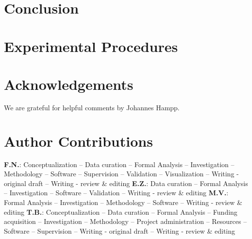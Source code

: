 \documentclass[12pt,preprint]{elsarticle}
\begin{document}


\section*{Conclusion}
\label{sec:conclusion}



\section*{Experimental Procedures}
\label{sec:methods}



\section*{Acknowledgements}


We are grateful for helpful comments by Johannes Hampp.



\section*{Author Contributions}


\textbf{F.N.}:
Conceptualization --
Data curation --
Formal Analysis --
Investigation --
Methodology --
Software --
Supervision --
Validation --
Visualization --
Writing - original draft --
Writing - review \& editing
\textbf{E.Z.}:
Data curation --
Formal Analysis --
Investigation --
Software --
Validation --
Writing - review \& editing
\textbf{M.V.}:
Formal Analysis --
Investigation --
Methodology --
Software --
Writing - review \& editing
\textbf{T.B.}:
Conceptualization --
Data curation --
Formal Analysis --
Funding acquisition --
Investigation --
Methodology --
Project administration --
Resources --
Software --
Supervision --
Writing - original draft --
Writing - review \& editing
\end{document}
